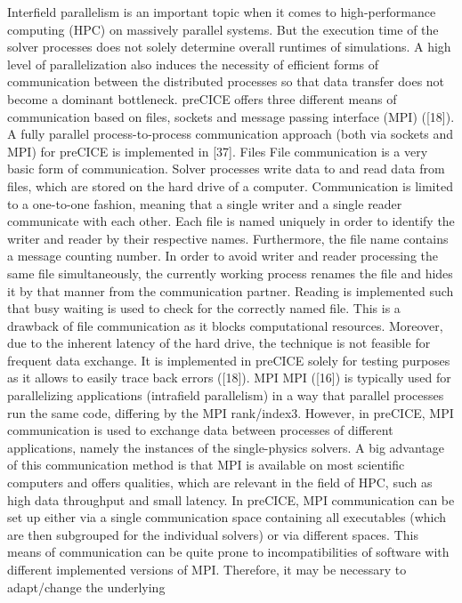 Interfield parallelism is an important topic when it comes to high-performance computing (HPC) on
massively parallel systems. But the execution time of the solver processes does not solely determine
overall runtimes of simulations. A high level of parallelization also induces the necessity of efficient forms
of communication between the distributed processes so that data transfer does not become a dominant
bottleneck. preCICE offers three different means of communication based on files, sockets and message
passing interface (MPI) ([18]). A fully parallel process-to-process communication approach (both via
sockets and MPI) for preCICE is implemented in [37].
Files
File communication is a very basic form of communication. Solver processes write data to and read data
from files, which are stored on the hard drive of a computer. Communication is limited to a one-to-one
fashion, meaning that a single writer and a single reader communicate with each other. Each file is
named uniquely in order to identify the writer and reader by their respective names. Furthermore, the
file name contains a message counting number. In order to avoid writer and reader processing the same
file simultaneously, the currently working process renames the file and hides it by that manner from the
communication partner. Reading is implemented such that busy waiting is used to check for the correctly
named file. This is a drawback of file communication as it blocks computational resources. Moreover,
due to the inherent latency of the hard drive, the technique is not feasible for frequent data exchange. It
is implemented in preCICE solely for testing purposes as it allows to easily trace back errors ([18]).
MPI
MPI ([16]) is typically used for parallelizing applications (intrafield parallelism) in a way that parallel
processes run the same code, differing by the MPI rank/index3. However, in preCICE, MPI communication
is used to exchange data between processes of different applications, namely the instances of
the single-physics solvers. A big advantage of this communication method is that MPI is available on
most scientific computers and offers qualities, which are relevant in the field of HPC, such as high data
throughput and small latency. In preCICE, MPI communication can be set up either via a single communication
space containing all executables (which are then subgrouped for the individual solvers) or via
different spaces. This means of communication can be quite prone to incompatibilities of software with
different implemented versions of MPI. Therefore, it may be necessary to adapt/change the underlying
